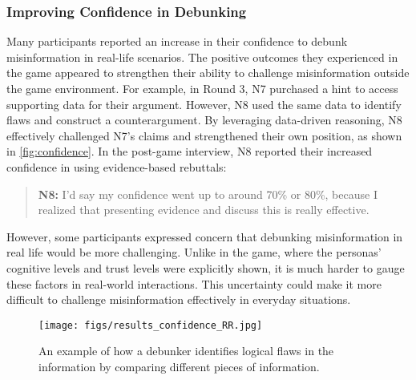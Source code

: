 \subsubsection{Improving Confidence in Debunking}
Many participants reported an increase in their confidence to debunk misinformation in real-life scenarios. %
The positive outcomes they experienced in the game appeared to strengthen their ability to challenge misinformation outside the game environment. For example, in Round 3, N7 purchased a hint to access supporting data for their argument. However, N8 used the same data to identify flaws and construct a counterargument. By leveraging data-driven reasoning, N8 effectively challenged N7’s claims and strengthened their own position, as shown in \autoref{fig:confidence}. In the post-game interview, N8 reported their increased confidence in using evidence-based rebuttals: 
\begin{quote}
    \textbf{N8:}
    I'd say my confidence went up to around 70\% or 80\%, because I realized that presenting evidence and discuss this is really effective.
\end{quote}


However, some participants expressed concern that debunking misinformation in real life would be more challenging. Unlike in the game, where the personas’ cognitive levels and trust levels were explicitly shown, it is much harder to gauge these factors in real-world interactions. This uncertainty could make it more difficult to challenge misinformation effectively in everyday situations.
\begin{figure}
    \centering
    \texttt{[image: figs/results\_confidence\_RR.jpg]}
    \caption{An example of how a debunker identifies logical flaws in the information by comparing different pieces of information.}
    \label{fig:confidence}
\end{figure}

